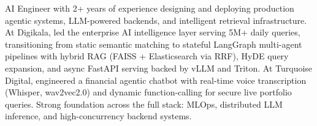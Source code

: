 \small{AI Engineer with 2+ years of experience designing and deploying production agentic systems, LLM-powered backends, and intelligent retrieval infrastructure. At Digikala, led the enterprise AI intelligence layer serving 5M+ daily queries, transitioning from static semantic matching to stateful LangGraph multi-agent pipelines with hybrid RAG (FAISS + Elasticsearch via RRF), HyDE query expansion, and async FastAPI serving backed by vLLM and Triton. At Turquoise Digital, engineered a financial agentic chatbot with real-time voice transcription (Whisper, wav2vec2.0) and dynamic function-calling for secure live portfolio queries. Strong foundation across the full stack: MLOps, distributed LLM inference, and high-concurrency backend systems.}\vspace{4pt}
